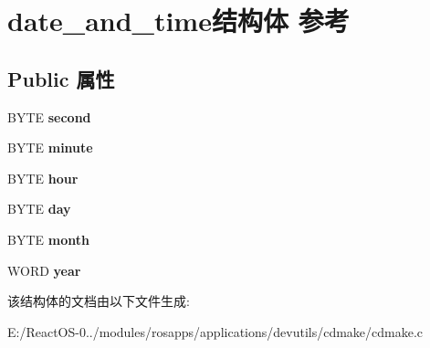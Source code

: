 \hypertarget{structdate__and__time}{}\section{date\+\_\+and\+\_\+time结构体 参考}
\label{structdate__and__time}
\subsection*{Public 属性}
\begin{DoxyCompactItemize}
\item 
\mbox{\label{structdate__and__time_a9ab33ad781e3a30e04d165f850cb4240}} 
B\+Y\+TE {\bfseries second}
\item 
\mbox{\label{structdate__and__time_ad4038603961ad30e9ecb66e936f3b1d1}} 
B\+Y\+TE {\bfseries minute}
\item 
\mbox{\label{structdate__and__time_adcc17dfce794fc8389d8c0db821c28c3}} 
B\+Y\+TE {\bfseries hour}
\item 
\mbox{\label{structdate__and__time_ad7073e8f0140e3bf70a11c915de7343f}} 
B\+Y\+TE {\bfseries day}
\item 
\mbox{\label{structdate__and__time_a6a0eb0cb36a2c9d5bcef33b2fe54d997}} 
B\+Y\+TE {\bfseries month}
\item 
\mbox{\label{structdate__and__time_aec6b7cffc66320d465a8afc731d08a86}} 
W\+O\+RD {\bfseries year}
\end{DoxyCompactItemize}


该结构体的文档由以下文件生成\+:\begin{DoxyCompactItemize}
\item 
E\+:/\+React\+O\+S-\/0../modules/rosapps/applications/devutils/cdmake/cdmake.\+c\end{DoxyCompactItemize}
